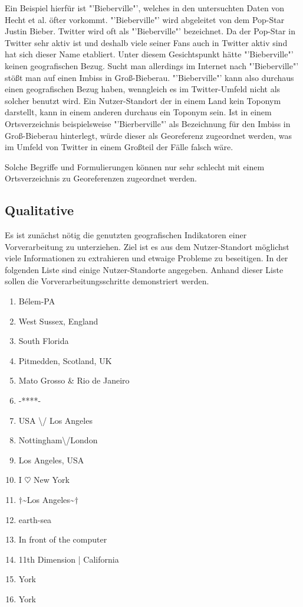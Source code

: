 			Ein Beispiel hierfür ist "'Bieberville"', welches in den untersuchten Daten von Hecht et al. öfter vorkommt.
			"'Bieberville"' wird abgeleitet von dem Pop-Star Justin Bieber.	
			Twitter wird oft als "'Bieberville"' bezeichnet.
			Da der Pop-Star in Twitter sehr aktiv ist und deshalb viele seiner Fans auch in Twitter aktiv sind hat sich dieser Name etabliert.
			Unter diesem Gesichtspunkt hätte "'Bieberville"' keinen geografischen Bezug.
			Sucht man allerdings im Internet nach "'Bieberville"' stößt man auf einen Imbiss in Groß-Bieberau.
			"'Bieberville"' kann also durchaus einen geografischen Bezug haben, wenngleich es im Twitter-Umfeld nicht als solcher benutzt wird. 
			Ein Nutzer-Standort der in einem Land kein Toponym darstellt, kann in einem anderen durchaus ein Toponym sein.
			Ist in einem Ortsverzeichnis beispielsweise "'Bierberville"' als Bezeichnung für den Imbiss in Groß-Bieberau hinterlegt, würde dieser als Georeferenz zugeordnet werden, was im Umfeld von Twitter in einem Großteil der Fälle falsch wäre.

			Solche Begriffe und Formulierungen können nur sehr schlecht mit einem Ortsverzeichnis zu Georeferenzen zugeordnet werden. 

		\subsection{Qualitative } 
			
			Es ist zunächst nötig die genutzten geografischen Indikatoren einer Vorverarbeitung zu unterziehen. 
			Ziel ist es aus dem Nutzer-Standort möglichst viele Informationen zu extrahieren und etwaige Probleme zu beseitigen.
			In der folgenden Liste sind einige Nutzer-Standorte angegeben. 
			Anhand dieser Liste sollen die Vorverarbeitungsschritte demonstriert werden.

			\begin{multicols}{2}
			\begin{enumerate}
				\item Bélem-PA
				\item West Sussex, England
				\item South Florida
				\item Pitmedden,  Scotland, UK
				\item Mato Grosso \& Rio de Janeiro
				\item -****-
				\item USA \textbackslash/ Los Angeles
				\item Nottingham\textbackslash/London
				\item Los Angeles, USA
				\item I $\heartsuit$ New York 
				\item $\dagger$\textasciitilde Los Angeles\textasciitilde$\dagger$
				\item earth-sea
				\item In front of the computer
				\item 11th Dimension | California
				\item York
				\item York
			\end{enumerate}
			\end{multicols}

